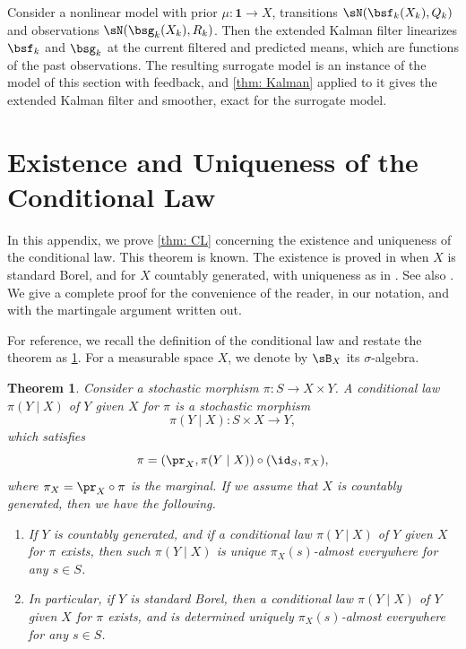 \documentclass[12pt,reqno]{amsart}%
\theoremstyle{plain}
\newtheorem{theorem}{Theorem}[section]
\theoremstyle{definition}
\def\bsone{\boldsymbol{1}}
\begin{document}
\begin{remark}
	Consider a nonlinear model with prior $\mu\colon\bsone\rightarrow X$,
	transitions $\sN(\bsf_k(X_k),Q_k)$ and observations
	$\sN(\bsg_k(X_k),R_k)$.  Then
	the extended Kalman filter linearizes $\bsf_k$ and $\bsg_k$ at the current filtered and predicted means,
	which are functions of the past observations.
	The resulting surrogate model is an instance of the model of this section with feedback,
	and \cref{thm: Kalman} applied to it gives the extended Kalman filter and smoother, exact for the surrogate model.
\end{remark}


\appendix
%
%
%
\section{Existence and Uniqueness of the Conditional Law}\label{sec: appendix A}
%
%
%

In this appendix, we prove \cref{thm: CL} concerning the existence and uniqueness of the conditional law.
This theorem is known.  The existence is proved in \cite[Theorem~1.25 (i)]{Kall17} when $X$ is standard Borel, and \cite[Theorem~2.29]{For21} for $X$ countably generated, with uniqueness as in \cite[Lemma~2.28]{For21}.   
See also \cite[Theorem~3.2]{Deg25}.
We give a complete proof for the convenience of the reader,
in our notation, and with the martingale argument written out.

For reference, we recall the definition of the conditional law and restate the theorem as \cref{thm: main}.
For a measurable space $X$, we denote by $\sB_X$ its $\sigma$-algebra.

\begin{theorem}\label{thm: main}
	Consider a stochastic morphism $\pi\colon S\rightarrow X\times Y$.
	 A \emph{conditional law} $\pi(Y\mid X)$ of $Y$ given $X$ for $\pi$ is a stochastic morphism
	\[
		\pi(Y\mid X)\colon S\times X\rightarrow Y,
	\]
	which satisfies
	\begin{equation}\label{eq: CL appendix}
		\pi=(\pr_X,\pi(Y\mid X))\circ(\id_S,\pi_X),
	\end{equation}
	where $\pi_X=\pr_X\circ\pi$ is the marginal.
	If we assume that $X$ is countably generated, then we have the following.
	\begin{enumerate}[label=(\roman*)]
		\item If $Y$ is countably generated, and if a conditional law
		 $\pi(Y\mid X)$ of $Y$ given $X$ for $\pi$ exists,
		then such $\pi(Y\mid X)$ is unique $\pi_X(s)$-almost everywhere for any $s\in S$.
		\item In particular, if $Y$ is standard Borel, then
		a conditional law
		 $\pi(Y\mid X)$ of $Y$ given $X$ for $\pi$ exists,
		 and is determined uniquely $\pi_X(s)$-almost everywhere for any $s\in S$.
	\end{enumerate}
\end{theorem}
\end{document}
